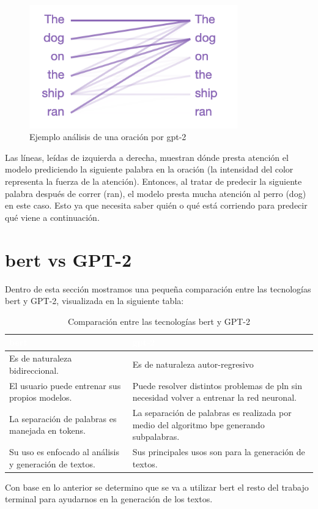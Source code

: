 \documentclass[12pt, a4paper, titlepage]{report}
\begin{document}
		    	\begin{figure}[H] 
		    		\includegraphics[width=9cm]{./imagenes/MarcoTeorico/Gptsentence.png}
		    		\centering 
		    		\caption{Ejemplo análisis de una oración por \acrshort{gpt}-2 \cite{refarquitecturagpt3}}
		    	\end{figure}
		    
		    	Las líneas, leídas de izquierda a derecha, muestran dónde presta atención el modelo prediciendo la siguiente palabra en la oración (la intensidad del color representa la fuerza de la atención). Entonces, al tratar de predecir la siguiente palabra después de correr (ran), el modelo presta mucha atención al perro (dog) en este caso. Esto ya que necesita saber quién o qué está corriendo para predecir qué viene a continuación. \cite{refarquitecturagpt3}    	
		    	
    	\section{\acrshort{bert} vs GPT-2}    	
    	Dentro de esta sección mostramos una pequeña comparación entre las tecnologías \acrshort{bert} y GPT-2, visualizada en la siguiente tabla:    	
    	\begin{table}[h!]    		
    		\caption[Comparación entre tecnologías BERT y GPT-2]{Comparación entre las tecnologías \acrshort{bert} y GPT-2}
    		\begin{tabular}{|m{6.5cm}|m{6.5cm}|}
    			\hline    			
    			\rowcolor{guindapoli}
    			{\textbf{\textcolor{white}{\acrshort{bert}}}} & {\textbf{\textcolor{white}{\acrshort{gpt}-2}}}\\
    			\hline
    			Es de naturaleza bidireccional. & Es de naturaleza autor-regresivo\\
    			\hline
    			El usuario puede entrenar sus propios modelos. & Puede resolver distintos problemas de \acrfull{pln} sin necesidad volver a entrenar la red neuronal.\\
    			\hline
    			La separación de palabras es manejada en tokens. & La separación de palabras es realizada por medio del algoritmo \acrfull{bpe} generando subpalabras.\\
    			\hline
    			Su uso es enfocado al análisis y generación de textos. & Sus principales usos son para la generación de textos.\\
    			\hline
    		\end{tabular}
    	\end{table}
        Con base en lo anterior se determino que se va a utilizar \acrshort{bert} el resto del trabajo terminal para ayudarnos en la generación de los textos. \pagebreak	
        
\end{document}
